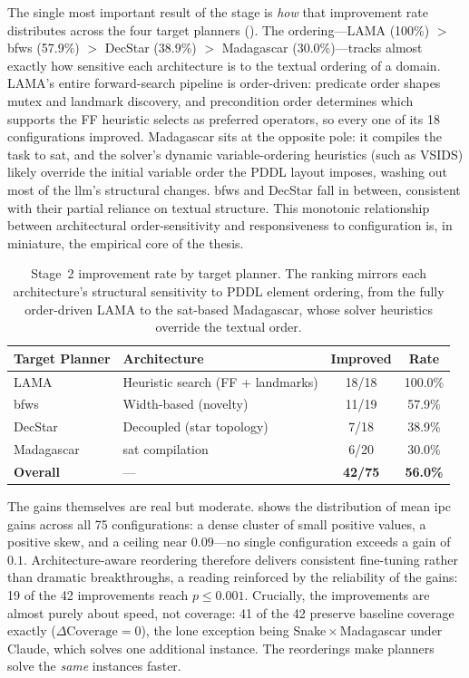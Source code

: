 The single most important result of the stage is \emph{how} that improvement rate distributes across the four target planners ().
The ordering---LAMA (100\%) $>$ \gls{bfws} (57.9\%) $>$ DecStar (38.9\%) $>$ Madagascar (30.0\%)---tracks almost exactly how sensitive each architecture is to the textual ordering of a domain.
LAMA's entire forward-search pipeline is order-driven: predicate order shapes mutex and landmark discovery, and precondition order determines which supports the FF heuristic selects as preferred operators, so every one of its 18 configurations improved.
Madagascar sits at the opposite pole: it compiles the task to \gls{sat}, and the solver's dynamic variable-ordering heuristics (such as VSIDS) likely override the initial variable order the PDDL layout imposes, washing out most of the \gls{llm}'s structural changes.
\gls{bfws} and DecStar fall in between, consistent with their partial reliance on textual structure.
This monotonic relationship between architectural order-sensitivity and responsiveness to configuration is, in miniature, the empirical core of the thesis.

\begin{table}[htbp]
  \centering
  \caption{Stage~2 improvement rate by target planner. The ranking mirrors each architecture's structural sensitivity to PDDL element ordering, from the fully order-driven LAMA to the \gls{sat}-based Madagascar, whose solver heuristics override the textual order.}
  \label{tab:s2_improvement_planner}
  \small
  \begin{tabular}{l l c c}
    \toprule
    \textbf{Target Planner} & \textbf{Architecture} & \textbf{Improved} & \textbf{Rate} \\
    \midrule
    LAMA  & Heuristic search (FF + landmarks) & 18/18 & 100.0\% \\
    \gls{bfws}  & Width-based (novelty)             & 11/19 & 57.9\% \\
    DecStar     & Decoupled (star topology)         & 7/18  & 38.9\% \\
    Madagascar  & \gls{sat} compilation             & 6/20  & 30.0\% \\
    \midrule
    \textbf{Overall} & --- & \textbf{42/75} & \textbf{56.0\%} \\
    \bottomrule
  \end{tabular}
\end{table}

The gains themselves are real but moderate.  shows the distribution of mean \gls{ipc} gains across all 75 configurations: a dense cluster of small positive values, a positive skew, and a ceiling near $0.09$---no single configuration exceeds a gain of $0.1$. Architecture-aware reordering therefore delivers consistent fine-tuning rather than dramatic breakthroughs, a reading reinforced by the reliability of the gains: 19 of the 42 improvements reach $p \leq 0.001$. Crucially, the improvements are almost purely about speed, not coverage: 41 of the 42 preserve baseline coverage exactly ($\Delta\text{Coverage} = 0$), the lone exception being Snake\,$\times$\,Madagascar under Claude, which solves one additional instance. The reorderings make planners solve the \emph{same} instances faster.

